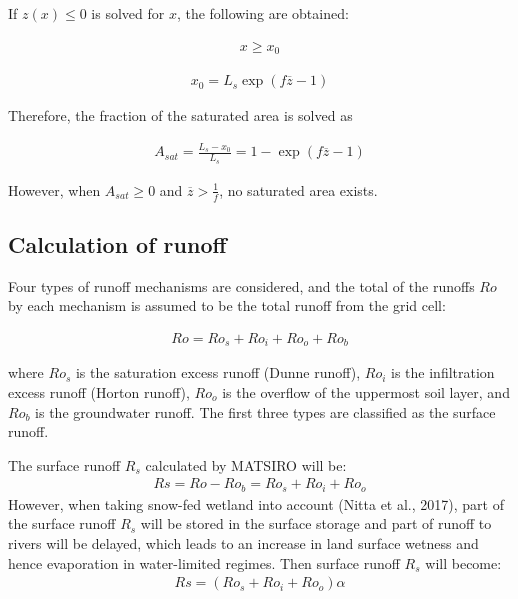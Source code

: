 If \(z(x) \leq 0\) is solved for \(x\), the following are obtained:

\begin{eqnarray}
x \geq x_0
\label{eq274}
\end{eqnarray}

\begin{eqnarray}
x_0 = L_s \exp(f\overline{z}-1)
\label{eq275}
\end{eqnarray}

Therefore, the fraction of the saturated area is solved as

\begin{eqnarray}
A_{sat} = \frac{L_s - x_0}{L_s} = 1 - \exp(f\overline{z}-1) \label{eq276}
\end{eqnarray}

However, when \(A_{sat} \geq 0\) and \(\overline{z} > \frac1f\), no saturated area exists.

\hypertarget{calculation-of-runoff}{%
\subsection{Calculation of runoff}\label{calculation-of-runoff}}

Four types of runoff mechanisms are considered, and the total of the runoffs \(Ro\) by each mechanism is assumed to be the total runoff from the grid cell:

\begin{eqnarray}
Ro = Ro_s + Ro_i + Ro_o + Ro_b
\label{eq277}
\end{eqnarray}

where \(Ro_s\) is the saturation excess runoff (Dunne runoff), \(Ro_i\) is the infiltration excess runoff (Horton runoff), \(Ro_o\) is the overflow of the uppermost soil layer, and \(Ro_b\) is the
groundwater runoff. The first three types are classified as the surface runoff.

The surface runoff \(R_s\) calculated by MATSIRO will be: \begin{eqnarray}
Rs=Ro-Ro_b=Ro_s + Ro_i + Ro_o
 \label{eq289}
\end{eqnarray} However, when taking snow-fed wetland into account (Nitta et al., 2017), part of the surface runoff \(R_s\) will be stored in the surface storage and part of runoff to rivers will be delayed, which
leads to an increase in land surface wetness and hence evaporation in water-limited regimes. Then surface runoff \(R_s\) will become: \begin{eqnarray}
Rs=(Ro_s + Ro_i + Ro_o)\alpha
 \label{eq290}
\end{eqnarray}

